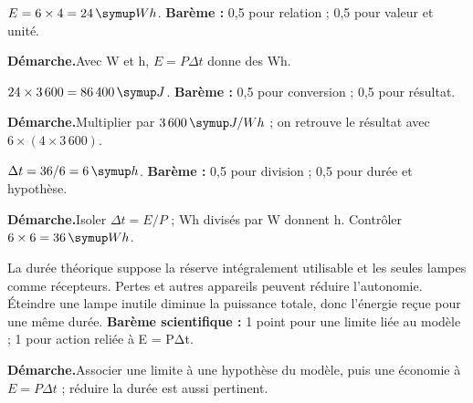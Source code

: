 \par\noindent\begin{minipage}{\linewidth}
$E=6\times4=24\unite{Wh}$. \textbf{Barème :} 0,5 pour relation ; 0,5 pour valeur et unité.\par
\smallskip\noindent\textbf{Démarche.}\enspace Avec W et h, $E=P\Delta t$ donne des Wh.\par
\end{minipage}\par
\par\noindent\begin{minipage}{\linewidth}
$24\times3\,600=86\,400\unite J$. \textbf{Barème :} 0,5 pour conversion ; 0,5 pour résultat.\par
\smallskip\noindent\textbf{Démarche.}\enspace Multiplier par $3\,600\unite{J/Wh}$ ; on retrouve le résultat avec $6\times(4\times3\,600)$.\par
\end{minipage}\par
\par\noindent\begin{minipage}{\linewidth}
$\Delta t=36/6=6\unite h$. \textbf{Barème :} 0,5 pour division ; 0,5 pour durée et hypothèse.\par
\smallskip\noindent\textbf{Démarche.}\enspace Isoler $\Delta t=E/P$ ; Wh divisés par W donnent h. Contrôler $6\times6=36\unite{Wh}$.\par
{}
\end{minipage}\par
\par\noindent\begin{minipage}{\linewidth}
La durée théorique suppose la réserve intégralement utilisable et les seules lampes comme récepteurs. Pertes et autres appareils peuvent réduire l’autonomie. Éteindre une lampe inutile diminue la puissance totale, donc l’énergie reçue pour une même durée. \textbf{Barème scientifique :} 1 point pour une limite liée au modèle ; 1 pour action reliée à E = PΔt.\par
\smallskip\noindent\textbf{Démarche.}\enspace Associer une limite à une hypothèse du modèle, puis une économie à $E=P\Delta t$ ; réduire la durée est aussi pertinent.\par
\end{minipage}\par
